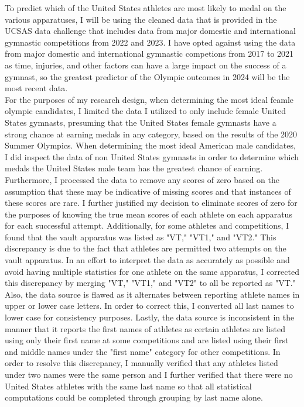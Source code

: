\documentclass[12pt]{article}
\begin{document}
To predict which of the United States athletes are most likely to medal on the various apparatuses, 
I will be using the cleaned data that 
is provided in the UCSAS data challenge that includes data from major domestic and international 
gymnastic competitions from 2022 and 2023. I have opted against using the data from major domestic
and international gymnastic competions from 2017 to 2021 as time, injuries, 
and other factors can have a large impact on the success of a gymnast, so the greatest predictor
of the Olympic outcomes in 2024 will be the most recent data.
\\
For the purposes of my research design, when determining the most ideal feamle olympic candidates, 
I limited the data I utilized to only include female United States
gymnasts, presuming that the United States female gymnasts have a strong chance at earning medals in any category, 
based on the results of the 2020 Summer Olympics. When determining the most ideal American male candidates, 
I did inspect the data of non United States gymnasts in order to determine which medals the United States 
male team has the greatest chance of earning. 
Furthermore, I processed the data to remove any scores of zero based on the assumption that these may 
be indicative of missing scores and that instances of these scores are rare. I further justified my decision 
to eliminate scores of zero for the purposes of knowing the true mean scores of each athlete on each 
apparatus for each successful attempt. Additionally, for some athletes and competitions, I found that the vault
apparatus was listed as "VT," "VT1," and "VT2." This discrepancy is due to the fact that athletes are permitted
two attempts on the vault apparatus. In an effort to interpret the data as accurately as possible and avoid having 
multiple statistics for one athlete on the same apparatus, I corrected this discrepancy by merging "VT," "VT1," and 
"VT2" to all be reported as "VT." Also, the data source is flawed as it alternates between reporting athlete names
in upper or lower case letters. In order to correct this, I converted all last names to lower case for consistency 
purposes. Lastly, the data source is inconsistent in the manner that it reports the first names of athletes as certain
athletes are listed using only their first name at some competitions and are listed using their first and middle names 
under the "first name" category for other competitions. In order to resolve this discrepancy, I manually verified that 
any athletes listed under two names were the same person and I further verified that there were no United States  
athletes with the same last name so that all statistical computations could be completed through grouping by last 
name alone.
\end{document}

